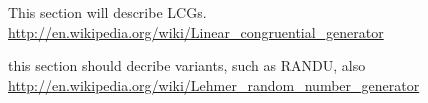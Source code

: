 This section will describe LCGs.
\url{http://en.wikipedia.org/wiki/Linear_congruential_generator}

this section should decribe variants, such as RANDU, also
\url{http://en.wikipedia.org/wiki/Lehmer_random_number_generator}

